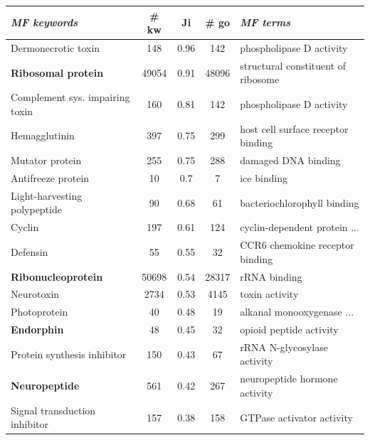 \documentclass{beamer}
\newcommand{\keyword}[1]{\textbf{#1}}
\begin{document}
\begin{frame}

  \hspace*{-0.4cm}
  \scriptsize
  \begin{tabular}{|p{4.2cm}|c|c|c|p{4.3cm}|}
    \hline
    \bf \textit{MF keywords } & \bf \# kw & \bf Ji & \bf \# go & \bf \textit{MF terms} \\
    \hline
    \hline
    Dermonecrotic toxin                & 148   & 0.96  & 142   & phospholipase D activity \\ \hline
    \keyword{Ribosomal protein}        & 49054 & 0.91  & 48096 & structural constituent of ribosome \\ \hline
    Complement sys. impairing toxin & 160   & 0.81  & 142   & phospholipase D activity \\ \hline
    Hemagglutinin                      & 397   & 0.75  & 299   & host cell surface receptor binding \\ \hline
    Mutator protein                    & 255   & 0.75  & 288   & damaged DNA binding \\ \hline
    Antifreeze protein                 & 10    & 0.7   & 7     & ice binding \\ \hline
    Light-harvesting polypeptide       & 90    & 0.68  & 61    & bacteriochlorophyll binding \\ \hline
    Cyclin                             & 197   & 0.61  & 124   & cyclin-dependent protein ... \\ \hline
    Defensin                           & 55    & 0.55  & 32    & CCR6 chemokine receptor binding \\ \hline
    \keyword{Ribonucleoprotein}        & 50698 & 0.54  & 28317 & rRNA binding \\ \hline
    Neurotoxin                         & 2734  & 0.53  & 4145  & toxin activity \\ \hline
    Photoprotein                       & 40    & 0.48  & 19    & alkanal monooxygenase ... \\ \hline
    \keyword{Endorphin}                & 48    & 0.45  & 32    & opioid peptide activity \\ \hline
    Protein synthesis inhibitor        & 150   & 0.43  & 67    & rRNA N-glycosylase activity \\ \hline
    \keyword{Neuropeptide}             & 561   & 0.42  & 267   & neuropeptide hormone activity \\ \hline
    Signal transduction inhibitor      & 157   & 0.38  & 158   & GTPase activator activity \\ \hline

\end{tabular}
\end{frame}
\end{document}
